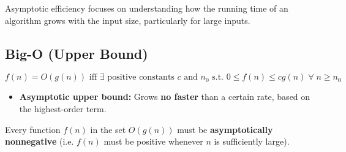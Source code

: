 Asymptotic efficiency focuses on understanding how the running time of an algorithm grows with the input size, particularly for large inputs.
\subsection{Big-O (Upper Bound)}
    \begin{definition} 
        $ f(n) = O(g(n)) \text{ iff } \exists \text{ positive constants } c \text{ and } n_0 \text{ s.t. } 0 \leq f(n) \leq c g(n) \; \forall \; n \geq n_0 $
        \begin{itemize}
            \item \textbf{Asymptotic upper bound:} Grows \textbf{no faster} than a certain rate, based on the highest-order term.
        \end{itemize}
    \end{definition}

    \begin{warning}
        Every function $f(n)$ in the set $O(g(n))$ must be \textbf{asymptotically nonnegative} (i.e. $f(n)$ must be positive whenever $n$ is sufficiently large).
    \end{warning}

